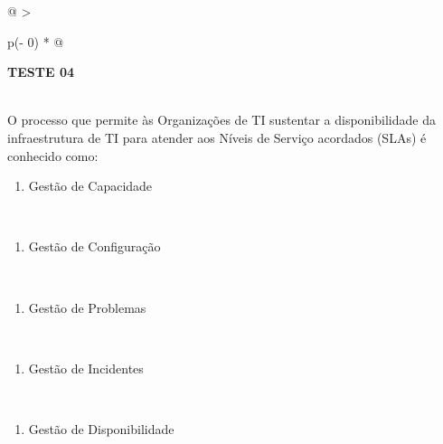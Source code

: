 \documentclass[
]{book}
\providecommand{\tightlist}{%
  \setlength{\itemsep}{0pt}\setlength{\parskip}{0pt}}
\begin{document}
\begin{longtable}[]{@{}
  >{\raggedright\arraybackslash}p{(\columnwidth - 0\tabcolsep) * }@{}}
\toprule\noalign{}
\begin{minipage}[b]{\linewidth}\raggedright
\textbf{TESTE 04}
\end{minipage} \\
\midrule\noalign{}
\endhead
\bottomrule\noalign{}
\endlastfoot
O processo que permite às Organizações de TI sustentar a disponibilidade da infraestrutura de TI para atender aos Níveis de Serviço acordados (SLAs) é conhecido como: \\
\begin{minipage}[t]{\linewidth}\raggedright
\begin{enumerate}
\def\labelenumi{\Alph{enumi})}
\tightlist
\item
  Gestão de Capacidade
\end{enumerate}
\end{minipage} \\
\begin{minipage}[t]{\linewidth}\raggedright
\begin{enumerate}
\def\labelenumi{\Alph{enumi})}
\setcounter{enumi}{1}
\tightlist
\item
  Gestão de Configuração
\end{enumerate}
\end{minipage} \\
\begin{minipage}[t]{\linewidth}\raggedright
\begin{enumerate}
\def\labelenumi{\Alph{enumi})}
\setcounter{enumi}{2}
\tightlist
\item
  Gestão de Problemas
\end{enumerate}
\end{minipage} \\
\begin{minipage}[t]{\linewidth}\raggedright
\begin{enumerate}
\def\labelenumi{\Alph{enumi})}
\setcounter{enumi}{3}
\tightlist
\item
  Gestão de Incidentes
\end{enumerate}
\end{minipage} \\
\begin{minipage}[t]{\linewidth}\raggedright
\begin{enumerate}
\def\labelenumi{\Alph{enumi})}
\setcounter{enumi}{4}
\tightlist
\item
  Gestão de Disponibilidade
\end{enumerate}
\end{minipage} \\
\end{longtable}
\end{document}
